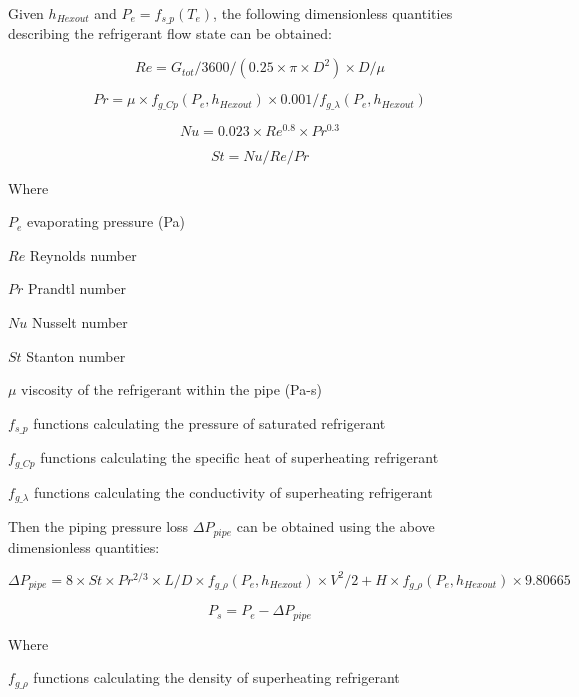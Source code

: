 Given $h_{Hexout}$ and $P_e=f_{s\_p}(T_e)$, the following dimensionless quantities describing the refrigerant flow state can be obtained:

\begin{equation}
  Re=G_{tot}/3600/(0.25\times\pi\times{D^2})\times{D}/\mu
\end{equation}

\begin{equation}
  Pr=\mu\times{f_{g\_Cp}(P_e,h_{Hexout})}\times{0.001}/f_{g\_\lambda}(P_e,h_{Hexout})
\end{equation}

\begin{equation}
  Nu=0.023\times{Re^{0.8}\times{Pr^{0.3}}}
\end{equation}

\begin{equation}
  St=Nu/Re/Pr
\end{equation}

Where

$P_e$ evaporating pressure (Pa) 

$Re$ Reynolds number 

$Pr$ Prandtl number 

$Nu$ Nusselt number 

$St$ Stanton number 

$\mu$ viscosity of the refrigerant within the pipe (Pa-s)

$f_{s\_p}$ functions calculating the pressure of saturated refrigerant 

$f_{g\_Cp}$ functions calculating the specific heat of superheating refrigerant 

$f_{g\_\lambda}$ functions calculating the conductivity of superheating refrigerant 

Then the piping pressure loss $\Delta{P_{pipe}}$ can be obtained using the above dimensionless quantities:

\begin{equation}
  \Delta{P_{pipe}}=8\times{St}\times{Pr^{2/3}}\times{L/D}\times{f_{g\_\rho}(P_e,h_{Hexout})}\times{V^2}/2+H\times{f_{g\_\rho}(P_e,h_{Hexout})}\times9.80665
\end{equation}

\begin{equation}
  P_s=P_e-\Delta{P_{pipe}}
\end{equation}

Where

$f_{g\_\rho}$	functions calculating the density of superheating refrigerant 

